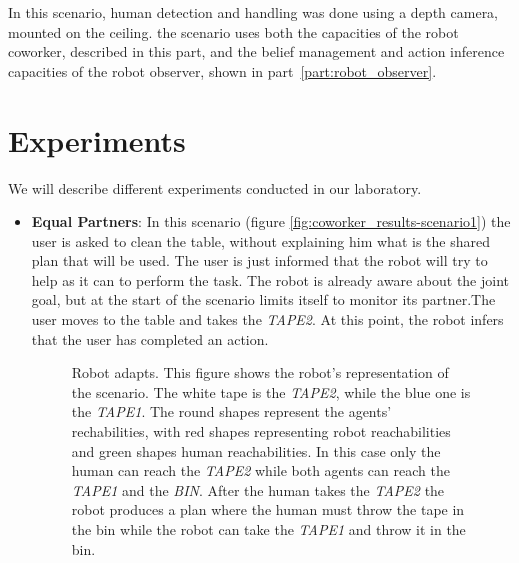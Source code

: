 In this scenario, human detection and handling was done using a depth camera, mounted on the ceiling. the scenario uses both the capacities of the robot coworker, described in this part, and the belief management and action inference capacities of the robot observer, shown in part~\ref{part:robot_observer}.

\section{Experiments}
\label{sec:coworker_experiments-experiment}
We will describe different experiments conducted in our laboratory.

\begin{itemize}
  \item
\textbf{Equal Partners}:
In this scenario (figure \ref{fig:coworker_results-scenario1}) the user is asked to clean the table, without explaining him what is the shared plan that will be used. The user is just informed that
the robot will try to help as it can to perform the task. The robot is already aware about the joint goal, but at the start of the scenario limits itself to monitor its partner.The user moves to the table and takes the \textit{TAPE2}. At this point, the robot infers that the user
has completed an action.
\begin{figure}
  \caption[Robot coworker experiment 1]{Robot adapts. This figure shows the robot's representation of the scenario. The white tape is the \textit{TAPE2}, while the blue
    one is the \textit{TAPE1}. The round shapes represent the agents'
    rechabilities, with red shapes representing robot reachabilities
    and green shapes human reachabilities. In this case only the human
  can reach the \textit{TAPE2} while both agents can reach the \textit{TAPE1}
and the \textit{BIN}. After the human takes the \textit{TAPE2} the
robot produces a plan where the human must throw the tape in the
bin while the robot can take the \textit{TAPE1} and throw it in the
bin.
}
\centering
  \subfigure{
}
\end{figure}
\end{itemize}
